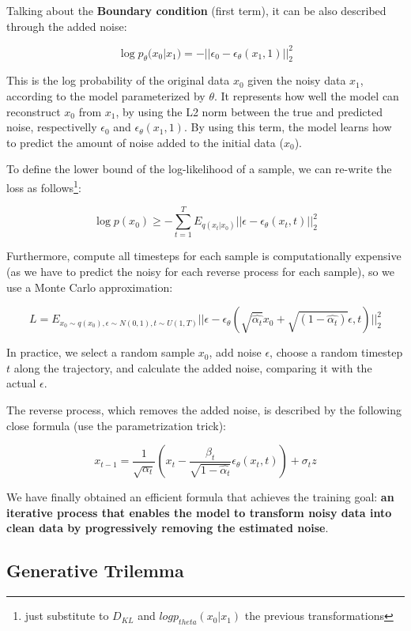 Talking about the \textbf{Boundary condition} (first term), it can be also described through the added noise:

$$\log p_{\theta}(x_0|x_1) = - || \epsilon_{0}-\epsilon_{\theta}(x_1, 1)||^{2}_2$$

This is the log probability of the original data $x_0$ given the noisy data $x_1$, according to the model parameterized by $\theta$. It represents how well the model can reconstruct $x_0$ from $x_1$, by using the L2 norm between the true and predicted noise, respectivelly $\epsilon_{0}$ and $\epsilon_{\theta}(x_1, 1)$. By using this term, the model learns how to predict the amount of noise added to the initial data ($x_0$).


To define the lower bound of the log-likelihood of a sample, we can re-write the loss as follows\footnote{just substitute to $D_{KL}$ and $log p_{theta}(x_0|x_1)$ the previous transformations}:

$$\log p(x_0) \geq - \sum_{t=1}^{T} E_{q(x_t|x_0)}||\epsilon - \epsilon_{\theta}(x_t,t)||^2_2$$ 

Furthermore, compute all timesteps for each sample is computationally expensive (as we have to predict the noisy for each reverse process for each sample), so we use a Monte Carlo approximation:

$$L = E_{x_0 \sim q(x_0), \epsilon \sim N(0,1), t \sim U(1,T)} ||\epsilon - \epsilon_{\theta}(\sqrt{\hat{\alpha_t}}x_0 + \sqrt{(1-\hat{\alpha_t})}\epsilon, t)||^{2}_2$$

In practice, we select a random sample $x_0$, add noise $\epsilon$, choose a random timestep $t$ along the trajectory, and calculate the added noise, comparing it with the actual $\epsilon$.


The reverse process, which removes the added noise, is described by the following close formula (use the parametrization trick):

$$x_{t-1}= \frac{1}{\sqrt{\alpha_t}}(x_t - \frac{\beta_t}{\sqrt{1-\hat{\alpha_t}}}\epsilon_{\theta}(x_t,t))+\sigma_t z$$

We have finally obtained an efficient formula that achieves the training goal: \textbf{an iterative process that enables the model to transform noisy data into clean data by progressively removing the estimated noise}.

\subsection{Generative Trilemma}

